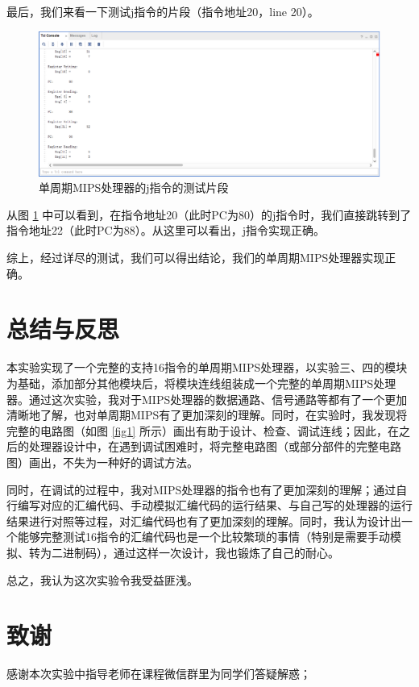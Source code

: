 \documentclass{cumcm}
\numberwithin{equation}{section}
\numberwithin{equation}{subsection}
\begin{document}
最后，我们来看一下测试j指令的片段（指令地址20，line 20）。

\begin{figure}[htbp]
    \centering
    \includegraphics[width=6in]{4-j.png}
    \caption{单周期MIPS处理器的j指令的测试片段}
    \label{fig5}
\end{figure}

从图 \ref{fig5} 中可以看到，在指令地址20（此时PC为80）的j指令时，我们直接跳转到了指令地址22（此时PC为88）。从这里可以看出，j指令实现正确。

综上，经过详尽的测试，我们可以得出结论，我们的单周期MIPS处理器实现正确。

\section{总结与反思}\label{section5}

本实验实现了一个完整的支持16指令的单周期MIPS处理器，以实验三、四的模块为基础，添加部分其他模块后，将模块连线组装成一个完整的单周期MIPS处理器。通过这次实验，我对于MIPS处理器的数据通路、信号通路等都有了一个更加清晰地了解，也对单周期MIPS有了更加深刻的理解。同时，在实验时，我发现将完整的电路图（如图 \ref{fig1} 所示）画出有助于设计、检查、调试连线；因此，在之后的处理器设计中，在遇到调试困难时，将完整电路图（或部分部件的完整电路图）画出，不失为一种好的调试方法。

同时，在调试的过程中，我对MIPS处理器的指令也有了更加深刻的理解；通过自行编写对应的汇编代码、手动模拟汇编代码的运行结果、与自己写的处理器的运行结果进行对照等过程，对汇编代码也有了更加深刻的理解。同时，我认为设计出一个能够完整测试16指令的汇编代码也是一个比较繁琐的事情（特别是需要手动模拟、转为二进制码），通过这样一次设计，我也锻炼了自己的耐心。

总之，我认为这次实验令我受益匪浅。


\section{致谢}\label{section6}
感谢本次实验中指导老师在课程微信群里为同学们答疑解惑；
\end{document}
